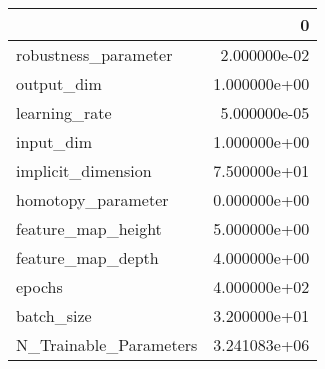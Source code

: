 \begin{tabular}{lr}
\toprule
{} &             0 \\
\midrule
robustness\_parameter   &  2.000000e-02 \\
output\_dim             &  1.000000e+00 \\
learning\_rate          &  5.000000e-05 \\
input\_dim              &  1.000000e+00 \\
implicit\_dimension     &  7.500000e+01 \\
homotopy\_parameter     &  0.000000e+00 \\
feature\_map\_height     &  5.000000e+00 \\
feature\_map\_depth      &  4.000000e+00 \\
epochs                 &  4.000000e+02 \\
batch\_size             &  3.200000e+01 \\
N\_Trainable\_Parameters &  3.241083e+06 \\
\bottomrule
\end{tabular}
